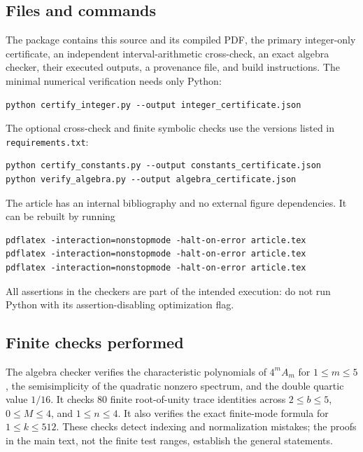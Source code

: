 \documentclass[11pt,a4paper]{article}
\theoremstyle{definition}
\theoremstyle{remark}
\numberwithin{equation}{section}
\begin{document}
\subsection{Files and commands}
The package contains this source and its compiled PDF, the primary
integer-only certificate, an independent interval-arithmetic cross-check,
an exact algebra checker, their executed outputs, a provenance file, and
build instructions. The minimal numerical verification needs only Python:
\begin{lstlisting}
python certify_integer.py --output integer_certificate.json
\end{lstlisting}
The optional cross-check and finite symbolic checks use the versions listed
in \texttt{requirements.txt}:
\begin{lstlisting}
python certify_constants.py --output constants_certificate.json
python verify_algebra.py --output algebra_certificate.json
\end{lstlisting}
The article has an internal bibliography and no external figure dependencies.
It can be rebuilt by running
\begin{lstlisting}
pdflatex -interaction=nonstopmode -halt-on-error article.tex
pdflatex -interaction=nonstopmode -halt-on-error article.tex
pdflatex -interaction=nonstopmode -halt-on-error article.tex
\end{lstlisting}
All assertions in the checkers are part of the intended execution: do not
run Python with its assertion-disabling optimization flag.

\subsection{Finite checks performed}
The algebra checker verifies the characteristic polynomials of $4^mA_m$
for $1\le m\le5$, the semisimplicity of the quadratic nonzero spectrum,
and the double quartic value $1/16$. It checks 80 finite root-of-unity trace
identities across $2\le b\le5$, $0\le M\le4$, and $1\le n\le4$.
It also verifies the exact finite-mode formula for $1\le k\le512$.
These checks detect indexing and normalization mistakes; the proofs in the
main text, not the finite test ranges, establish the general statements.
\end{document}
